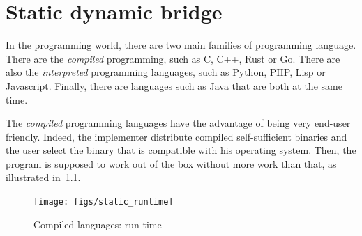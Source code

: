 \chapter{Static dynamic bridge}
\label{chap:static_dynamic_bridge}


In the programming world, there are two main families of programming language. There are the \emph{compiled}
programming, such as C, C++, Rust or Go. There are also the \emph{interpreted} programming languages, such as Python,
PHP, Lisp or Javascript. Finally, there are languages such as Java that are both at the same time.

The \emph{compiled} programming languages have the advantage of being very end-user friendly. Indeed, the implementer
distribute compiled self-sufficient binaries and the user select the binary that is compatible with his operating
system. Then, the program is supposed to work out of the box without more work than that, as illustrated
in~\cref{fig:static.dynamic.compiled.runtime}.

\begin{figure}[tbh]
  \centering
  \texttt{[image: figs/static\_runtime]}
  \caption{Compiled languages: run-time}
  \label{fig:static.dynamic.compiled.runtime}
\end{figure}

